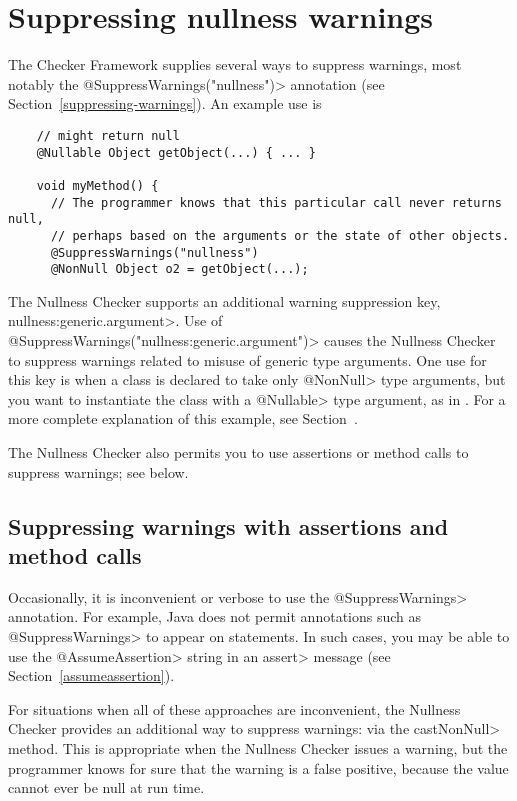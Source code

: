 \section{Suppressing nullness warnings\label{suppressing-warnings-nullness}}

The Checker Framework supplies several ways to suppress warnings, most
notably the \<@SuppressWarnings("nullness")> annotation (see
Section~\ref{suppressing-warnings}).  An example use is

\begin{Verbatim}
    // might return null
    @Nullable Object getObject(...) { ... }

    void myMethod() {
      // The programmer knows that this particular call never returns null,
      // perhaps based on the arguments or the state of other objects.
      @SuppressWarnings("nullness")
      @NonNull Object o2 = getObject(...);
\end{Verbatim}


The Nullness Checker supports an additional warning suppression key,
\<nullness:generic.argument>.
Use of \<@SuppressWarnings("nullness:generic.argument")> causes the Nullness
Checker to suppress warnings related to misuse of generic type
arguments.  One use for this key is when a class is declared to take only
\<@NonNull> type arguments, but you want to instantiate the class with a
\<@Nullable> type argument, as in .  For a more
complete explanation of this example, see
Section~.

The Nullness Checker also permits you to use assertions or method calls to
suppress warnings; see below.



\subsection{Suppressing warnings with assertions and method calls\label{suppressing-warnings-with-assertions}}

Occasionally, it is inconvenient or
verbose to use the \<@SuppressWarnings> annotation.  For example, Java does
not permit annotations such as \<@SuppressWarnings> to appear on statements.
In such cases, you may be able to use the \<@AssumeAssertion> string in
an \<assert> message (see Section~\ref{assumeassertion}).

For situations when all of these approaches are inconvenient,
the Nullness Checker provides an additional way to suppress warnings:
via the \<castNonNull> method.  This is
appropriate when the Nullness Checker issues a warning, but the programmer
knows for sure that the warning is a false positive, because the value
cannot ever be null at run time.

